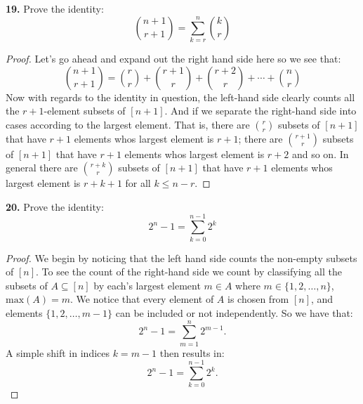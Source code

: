 \documentclass[12pt]{amsart}
\begin{document}
\begin{onehalfspace}
        \textbf{19.} Prove the identity:
        \begin{displaymath}
            \binom{n+1}{r+1} = \sum_{k=r}^n \binom{k}{r}
        \end{displaymath}
        \begin{proof}
            Let's go ahead and expand out the right hand side here so we see that:
            \begin{displaymath}
                \binom{n+1}{r+1} = \binom{r}{r} + \binom{r+1}{r} + \binom{r+2}{r} + \cdots + \binom{n}{r}
            \end{displaymath}
            Now with regards to the identity in question, the left-hand side clearly counts all the $r+1$-element subsets
            of $[n+1]$.
            And if we separate the right-hand side into cases according to the largest element.
            That is, there are $\binom{r}{r}$ subsets of $[n+1]$ that have $r + 1$ elements whos largest element is
            $r + 1$; there are $\binom{r+1}{r}$ subsets of $[n+1]$ that have $r+1$ elements whos largest element is
            $r +2$ and so on.
            In general there are $\binom{r+k}{r}$ subsets of $[n+1]$ that have $r+1$ elements whos largest element
            is $r+k+1$ for all $k\le n -r$.
        \end{proof}

        \textbf{20.} Prove the identity:
        \begin{displaymath}
            2^n - 1 = \sum_{k=0}^{n-1} 2^k
        \end{displaymath}
        \begin{proof}
            We begin by noticing that the left hand side counts the non-empty subsets of $[n]$.
            To see the count of the right-hand side we count by classifying all the subsets of $A\subseteq[n]$ by each's
            largest element $m\in A$ where $m\in\{1,2,\ldots,n\}$, $\text{max}(A) = m$.
            We notice that every element of $A$ is chosen from $[n]$, and elements $\{1, 2, \ldots, m-1\}$  can
            be included or not independently. So we have that:
            \begin{displaymath}
                2^n - 1 = \sum_{m=1}^{n} 2^{m-1}.
            \end{displaymath}
            A simple shift in indices $k=m-1$ then results in:
            \begin{displaymath}
                2^n - 1 = \sum_{k=0}^{n-1} 2^k.
            \end{displaymath}


\end{proof}
\end{onehalfspace}
\end{document}
